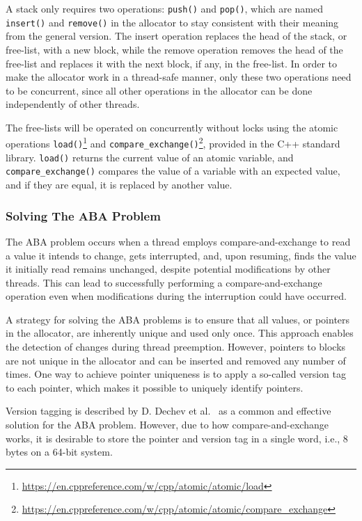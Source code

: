 A stack only requires two operations: \texttt{push()} and \texttt{pop()}, which are named \texttt{insert()} and \texttt{remove()} in the allocator to stay consistent with their meaning from the general version. The insert operation replaces the head of the stack, or free-list, with a new block, while the remove operation removes the head of the free-list and replaces it with the next block, if any, in the free-list. In order to make the allocator work in a thread-safe manner, only these two operations need to be concurrent, since all other operations in the allocator can be done independently of other threads.

The free-lists will be operated on concurrently without locks using the atomic operations \texttt{load()}\footnote{\url{https://en.cppreference.com/w/cpp/atomic/atomic/load}} and \texttt{compare\_exchange()}\footnote{\url{https://en.cppreference.com/w/cpp/atomic/atomic/compare_exchange}}, provided in the C++ standard library. \texttt{load()} returns the current value of an atomic variable, and \texttt{compare\_exchange()} compares the value of a variable with an expected value, and if they are equal, it is replaced by another value.

\subsubsection{Solving The ABA Problem}
\label{sec:adaptations_impl:aba_problem}

The ABA problem occurs when a thread employs compare-and-exchange to read a value it intends to change, gets interrupted, and, upon resuming, finds the value it initially read remains unchanged, despite potential modifications by other threads. This can lead to successfully performing a compare-and-exchange operation even when modifications during the interruption could have occurred.

A strategy for solving the ABA problems is to ensure that all values, or pointers in the allocator, are inherently unique and used only once. This approach enables the detection of changes during thread preemption. However, pointers to blocks are not unique in the allocator and can be inserted and removed any number of times. One way to achieve pointer uniqueness is to apply a so-called version tag to each pointer, which makes it possible to uniquely identify pointers.

Version tagging is described by D. Dechev et al.~\cite{bjarne_aba} as a common and effective solution for the ABA problem. However, due to how compare-and-exchange works, it is desirable to store the pointer and version tag in a single word, i.e., 8 bytes on a 64-bit system. 


